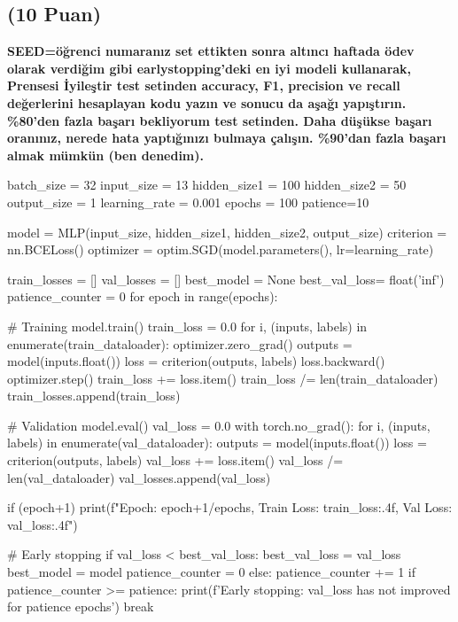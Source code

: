 \documentclass[11pt]{article}
\begin{document}
\subsection{(10 Puan)} \textbf{SEED=öğrenci numaranız set ettikten sonra altıncı haftada ödev olarak verdiğim gibi earlystopping'deki en iyi modeli kullanarak, Prensesi İyileştir test setinden accuracy, F1, precision ve recall değerlerini hesaplayan kodu yazın ve sonucu da aşağı yapıştırın. \%80'den fazla başarı bekliyorum test setinden. Daha düşükse başarı oranınız, nerede hata yaptığınızı bulmaya çalışın. \%90'dan fazla başarı almak mümkün (ben denedim).}

\begin{python}

batch_size = 32
input_size = 13
hidden_size1 = 100
hidden_size2 = 50
output_size = 1
learning_rate = 0.001
epochs = 100
patience=10



model = MLP(input_size, hidden_size1, hidden_size2, output_size)
criterion = nn.BCELoss()
optimizer = optim.SGD(model.parameters(), lr=learning_rate)



train_losses = []
val_losses = []
best_model = None
best_val_loss= float('inf')
patience_counter = 0
for epoch in range(epochs):

        # Training
    model.train()
    train_loss = 0.0
    for i, (inputs, labels) in enumerate(train_dataloader):
        optimizer.zero_grad()
        outputs = model(inputs.float())
        loss = criterion(outputs, labels)
        loss.backward()
        optimizer.step()
        train_loss += loss.item()
    train_loss /= len(train_dataloader)
    train_losses.append(train_loss)



        # Validation
    model.eval()
    val_loss = 0.0
    with torch.no_grad():
        for i, (inputs, labels) in enumerate(val_dataloader):
            outputs = model(inputs.float())
            loss = criterion(outputs, labels)
            val_loss += loss.item()
    val_loss /= len(val_dataloader)
    val_losses.append(val_loss)

    if (epoch+1) %
        print(f"Epoch: {epoch+1}/{epochs}, Train Loss: {train_loss:.4f}, Val Loss: {val_loss:.4f}")


# Early stopping
    if val_loss < best_val_loss:
        best_val_loss = val_loss
        best_model = model
        patience_counter = 0
    else:
        patience_counter += 1
        if patience_counter >= patience:
            print(f'Early stopping: val_loss has not improved for {patience} epochs')
            break




\end{python}
\end{document}
